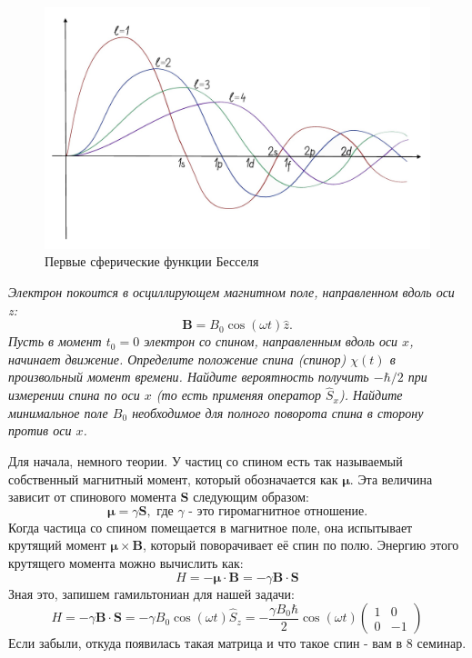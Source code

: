 \begin{figure}[h!]
\centering
\includegraphics[scale=0.3]{class_10/images/bessel.jpg}
\caption{Первые сферические функции Бесселя}
\label{fig 10.1}
\end{figure}



\begin{center}
    \textit{Электрон покоится в осциллирующем магнитном поле, направленном вдоль оси z:}
    \[
    \mathbf{B} = B_0\cos(\omega t)\hat{z}.
    \]
    \textit{Пусть в момент $t_0 = 0$ электрон со спином, направленным вдоль оси $x$, начинает движение. Определите положение спина (спинор) $\chi(t)$ в произвольный момент времени. Найдите вероятность получить $-\hbar/2$ при измерении спина по оси $x$ (то есть применяя оператор $\hat{S}_x$). Найдите минимальное поле $B_0$ необходимое для полного поворота спина в сторону против оси $x$.}
\end{center}

Для начала, немного теории. У частиц со спином есть так называемый собственный магнитный момент, который обозначается как $\boldsymbol{\mu}$. Эта величина зависит от спинового момента $\mathbf{S}$ следующим образом:
\[
\boldsymbol{\mu} = \gamma \mathbf{S}, \text{ где $\gamma$ - это гиромагнитное отношение.}
\]
Когда частица со спином помещается в магнитное поле, она испытывает крутящий момент $\boldsymbol{\mu} \times \mathbf{B}$, который поворачивает её спин по полю. Энергию этого крутящего момента можно вычислить как:
\[
H = -\boldsymbol{\mu}\cdot\mathbf{B} = -\gamma\mathbf{B}\cdot\mathbf{S}
\]
Зная это, запишем гамильтониан для нашей задачи:
\[
H = -\gamma\mathbf{B}\cdot\mathbf{S} = -\gamma B_0\cos(\omega t) \hat{S}_z = -\frac{\gamma B_0\hbar}{2}\cos(\omega t)\begin{pmatrix} 1 & 0 \\ 0 & -1 \end{pmatrix}
\]
Если забыли, откуда появилась такая матрица и что такое спин - вам в 8 семинар. 

